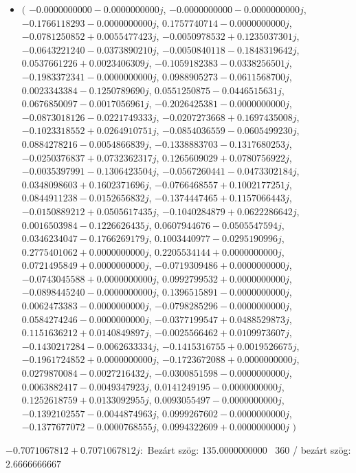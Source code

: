 \documentclass[14pt,a4paper]{article}
\begin{document}
\begin{itemize}
\item
$\big($
$-0.0000000000-0.0000000000j$, $-0.0000000000-0.0000000000j$, $-0.1766118293-0.0000000000j$, $0.1757740714-0.0000000000j$, $-0.0781250852+0.0055477423j$, $-0.0050978532+0.1235037301j$, $-0.0643221240-0.0373890210j$, $-0.0050840118-0.1848319642j$, $0.0537661226+0.0023406309j$, $-0.1059182383-0.0338256501j$, $-0.1983372341-0.0000000000j$, $0.0988905273-0.0611568700j$, $0.0023343384-0.1250789690j$, $0.0551250875-0.0446515631j$, $0.0676850097-0.0017056961j$, $-0.2026425381-0.0000000000j$, $-0.0873018126-0.0221749333j$, $-0.0207273668+0.1697435008j$, $-0.1023318552+0.0264910751j$, $-0.0854036559-0.0605499230j$, $0.0884278216-0.0054866839j$, $-0.1338883703-0.1317680253j$, $-0.0250376837+0.0732362317j$, $0.1265609029+0.0780756922j$, $-0.0035397991-0.1306423504j$, $-0.0567260441-0.0473302184j$, $0.0348098603+0.1602371696j$, $-0.0766468557+0.1002177251j$, $0.0844911238-0.0152656832j$, $-0.1374447465+0.1157066443j$, $-0.0150889212+0.0505617435j$, $-0.1040284879+0.0622286642j$, $0.0016503984-0.1226626435j$, $0.0607944676-0.0505547594j$, $0.0346234047-0.1766269179j$, $0.1003440977-0.0295190996j$, $0.2775401062+0.0000000000j$, $0.2205534144+0.0000000000j$, $0.0721495849+0.0000000000j$, $-0.0719309486+0.0000000000j$, $-0.0743045588+0.0000000000j$, $0.0992799532+0.0000000000j$, $-0.0898445240-0.0000000000j$, $0.1396515891-0.0000000000j$, $0.0062473383-0.0000000000j$, $-0.0798285296-0.0000000000j$, $0.0584274246-0.0000000000j$, $-0.0377199547+0.0488529873j$, $0.1151636212+0.0140849897j$, $-0.0025566462+0.0109973607j$, $-0.1430217284-0.0062633334j$, $-0.1415316755+0.0019526675j$, $-0.1961724852+0.0000000000j$, $-0.1723672088+0.0000000000j$, $0.0279870084-0.0027216432j$, $-0.0300851598-0.0000000000j$, $0.0063882417-0.0049347923j$, $0.0141249195-0.0000000000j$, $0.1252618759+0.0133092955j$, $0.0093055497-0.0000000000j$, $-0.1392102557-0.0044874963j$, $0.0999267602-0.0000000000j$, $-0.1377677072-0.0000768555j$, $0.0994322609+0.0000000000j$
$\big)$
\end{itemize}
$-0.7071067812+0.7071067812j$:\
Bezárt szög: $135.0000000000$ \
360 / bezárt szög: $2.6666666667$\
\end{document}
